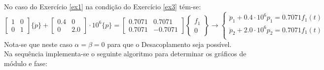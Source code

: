 \documentclass{article}
\begin{document}
\begin{resolution}
    No caso do Exercício \ref{ex1} na condição do Exercício \ref{ex3} tém-se:
    \begin{equation*}
        \begin{bmatrix} 1 & 0\\ 0 & 1\end{bmatrix}\{\ddot{p}\} + 
        \begin{bmatrix} 0.4 & 0\\ 0 & 2.0\end{bmatrix}\cdot 10^6 \{p\} = 
        \begin{bmatrix} 0.7071 & 0.7071\\ 0.7071 & -0.7071\end{bmatrix}\begin{Bmatrix} f_1\\ 0\end{Bmatrix} \to
        \begin{cases}
            \ddot{p}_1 + 0.4 \cdot 10^6 p_1 = 0.7071 f_1(t)\\
            \ddot{p}_2 + 2.0 \cdot 10^6 p_2 = 0.7071 f_1(t)\\
        \end{cases}
    \end{equation*}
    Nota-se que neste caso $\alpha = \beta = 0$ para que o Desacoplamento seja possível.\\

    Na sequência implementa-se o seguinte algoritmo para determinar os gráficos de módulo e fase:
    \begin{scriptsize}
        \myMatlab
    \end{scriptsize}
\end{resolution}
\end{document}
